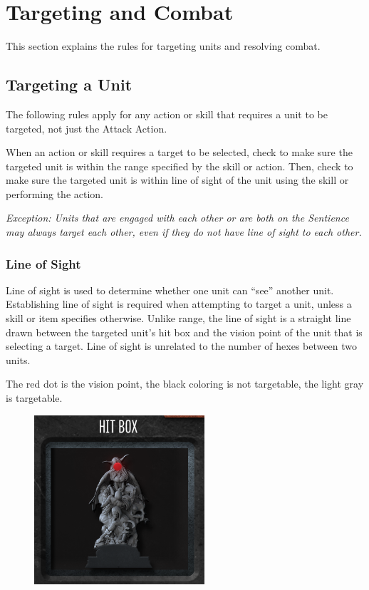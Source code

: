 \documentclass[../main.tex]{subfiles}
\begin{document}
\section{Targeting and Combat}
This section explains the rules for targeting units and resolving combat.

\subsection{Targeting a Unit}
The following rules apply for any action or skill that requires a unit to be targeted, not just the Attack Action.

When an action or skill requires a target to be selected, check to make sure the targeted unit is within the range specified by the skill or action. Then, check to make sure the targeted unit is within line of sight of the unit using the skill or performing the action.

\textit{Exception: Units that are engaged with each other or are both on the Sentience may always target each other, even if they do not have line of sight to each other.}

\subsubsection{Line of Sight}
Line of sight is used to determine whether one unit can “see” another unit. Establishing line of sight is required when attempting to target a unit, unless a skill or item specifies otherwise. Unlike range, the line of sight is a straight line drawn between the targeted unit’s hit box and the vision point of the unit that is selecting a target. Line of sight is unrelated to the number of hexes between two units.

The red dot is the vision point, the black coloring is not targetable, the light gray is targetable.

\begin{figure}[h]
    \centering
    \includegraphics[width=0.75\linewidth]{chapters//TargetingandCombat/TimeStrikeHitBox.png}
\end{figure}
\end{document}
